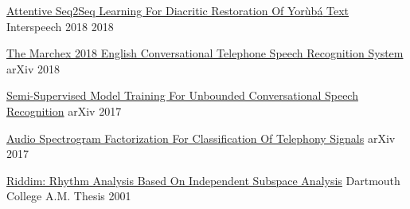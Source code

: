 \begin{cvhonors}
  \cvhonor
    {\href{https://arxiv.org/pdf/1804.00832}{Attentive Seq2Seq Learning For Diacritic Restoration Of Yor{\`u}b{\'a} Text}} %
    {Interspeech 2018} %
    {} %
    {2018} %

  \cvhonor
    {\href{https://arxiv.org/pdf/1811.02058}{The Marchex 2018 English Conversational Telephone Speech Recognition System}} %
    {arXiv} %
    {} %
    {2018} %

  \cvhonor
    {\href{https://arxiv.org/pdf/1705.09724}{Semi-Supervised Model Training For Unbounded Conversational Speech Recognition}} %
    {arXiv} %
    {} %
    {2017} %

  \cvhonor
    {\href{https://arxiv.org/abs/1811.04139}{Audio Spectrogram Factorization For Classification Of Telephony Signals}} %
    {arXiv} %
    {} %
    {2017} %


  \cvhonor
    {\href{https://arxiv.org/abs/1705.04792}{Riddim: Rhythm Analysis Based On Independent Subspace Analysis}} %
    {Dartmouth College A.M. Thesis} %
    {} %
    {2001} %
%    

\end{cvhonors}




